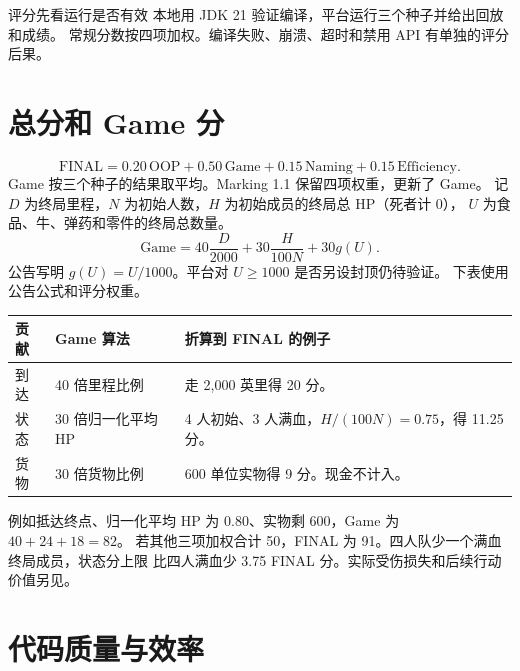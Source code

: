 \documentclass[UTF8,11pt,a4paper]{ctexart}
\begin{document}
\maketitle
\thispagestyle{fancy}

\begin{keybox}{评分先看运行是否有效}
本地用 JDK 21 验证编译，平台运行三个种子并给出回放和成绩。
常规分数按四项加权。编译失败、崩溃、超时和禁用 API 有单独的评分后果。
\end{keybox}

\section{总分和 Game 分}

\[
\mathrm{FINAL}=0.20\,\mathrm{OOP}+0.50\,\mathrm{Game}
  +0.15\,\mathrm{Naming}+0.15\,\mathrm{Efficiency}.
\]
Game 按三个种子的结果取平均。Marking 1.1 保留四项权重，更新了 Game。
记 $D$ 为终局里程，$N$ 为初始人数，$H$ 为初始成员的终局总 HP（死者计 0），
$U$ 为食品、牛、弹药和零件的终局总数量。
\[
\mathrm{Game}=40\frac{D}{2000}+30\frac{H}{100N}+30g(U).
\]
公告写明 $g(U)=U/1000$。平台对 $U\ge1000$ 是否另设封顶仍待验证。
下表使用公告公式和评分权重。  
\begin{center}\small
\begin{tabularx}{\linewidth}{@{}L{2.2cm}L{4.6cm}Y@{}}
\toprule
贡献 & Game 算法 & 折算到 FINAL 的例子 \\
\midrule
到达 & 40 倍里程比例 & 走 2,000 英里得 20 分。 \\
状态 & 30 倍归一化平均 HP & 4 人初始、3 人满血，$H/(100N)=0.75$，得 11.25 分。 \\
货物 & 30 倍货物比例 & 600 单位实物得 9 分。现金不计入。 \\
\bottomrule
\end{tabularx}
\end{center}
例如抵达终点、归一化平均 HP 为 $0.80$、实物剩 600，Game 为 $40+24+18=82$。
若其他三项加权合计 50，FINAL 为 91。四人队少一个满血终局成员，状态分上限
比四人满血少 3.75 FINAL 分。实际受伤损失和后续行动价值另见。

\section{代码质量与效率}
\end{document}
